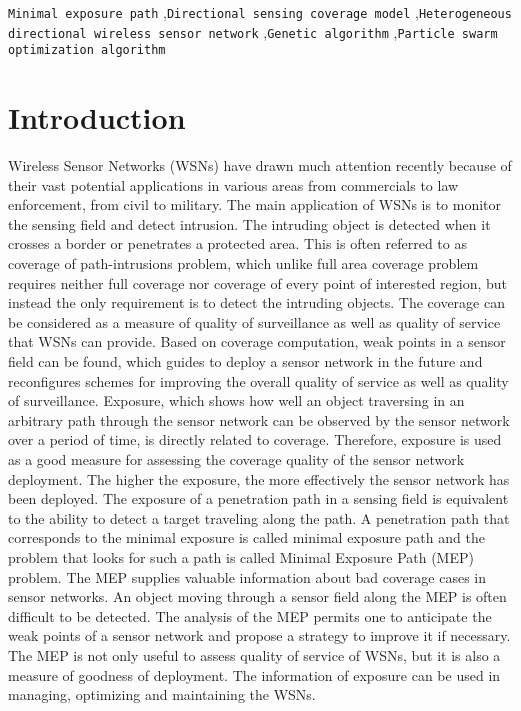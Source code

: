 \documentclass[final]{elsarticle}
\begin{document}
\begin{frontmatter}
\begin{abstract}
\end{abstract}
\begin{keyword}
\texttt{Minimal exposure path} \sep \texttt{Directional sensing coverage model} \sep \texttt{Heterogeneous directional wireless sensor network} \sep \texttt{Genetic algorithm} \sep\texttt{Particle swarm optimization algorithm}
\end{keyword}
\end{frontmatter}
\section{Introduction}
Wireless Sensor Networks (WSNs) have drawn much attention recently because of their vast potential applications in various areas from commercials to law enforcement, from civil to military. The main application of WSNs is to monitor the sensing field and detect intrusion. The intruding object is detected when it crosses a border or penetrates a protected area. This is often referred to as coverage of path-intrusions problem, which unlike full area coverage problem requires neither full coverage nor coverage of every point of interested region, but instead the only requirement is to detect the intruding objects. The coverage can be considered as a measure of quality of surveillance as well as quality of service that WSNs can provide. Based on coverage computation, weak points in a sensor field can be found, which guides to deploy a sensor network in the future and reconfigures schemes for improving the overall quality of service as well as quality of surveillance.
Exposure, which shows how well an object traversing in an arbitrary path through the sensor network can be observed by the sensor network over a period of time, is directly related to coverage. Therefore, exposure is used as a good measure for assessing the coverage quality of the sensor network deployment. The higher the exposure, the more effectively the sensor network has been deployed. The exposure of a penetration path in a sensing field is equivalent to the ability to detect a target traveling along the path. A penetration path that corresponds to the minimal exposure is called minimal exposure path and the problem that looks for such a path is called Minimal Exposure Path (MEP) problem. The MEP supplies valuable information about bad coverage cases in sensor networks. An object moving through a sensor field along the MEP is often difficult to be detected. The analysis of the MEP permits one to anticipate the weak points of a sensor network and propose a strategy to improve it if necessary. The MEP is not only useful to assess quality of service of WSNs, but it is also a measure of goodness of deployment. The information of exposure can be used in managing, optimizing and maintaining the WSNs.
\end{document}
